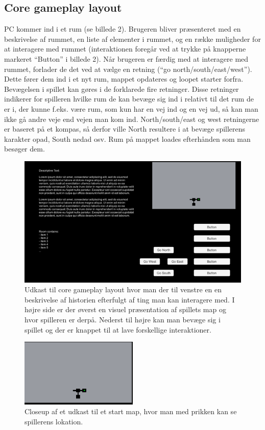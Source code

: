 \subsection{Core gameplay layout}
PC kommer ind i et rum (se billede 2).  Brugeren bliver præsenteret med en beskrivelse af rummet, en liste af elementer i rummet, og en række muligheder for at interagere med rummet (interaktionen foregår ved at trykke på knapperne markeret “Button” i billede 2). Når brugeren er færdig med at interagere med rummet, forlader de det ved at vælge en retning (“go north/south/east/west”). 
Dette fører dem ind i et nyt rum, mappet opdateres og loopet starter forfra.
Bevægelsen i spillet kan gøres i de forklarede fire retninger. Disse retninger indikerer for spilleren hvilke rum de kan bevæge sig ind i relativt til det rum de er i, der kunne f.eks. være rum, som kun har en vej ind og en vej ud, så kan man ikke gå andre veje end vejen man kom ind. North/south/east og west retningerne er baseret på et kompas, så derfor ville North resultere i at bevæge spillerens karakter opad, South nedad osv.
Rum på mappet loades efterhånden som man besøger dem.

\begin{figure}[H]
\centering
\includegraphics[width = \textwidth]{02-Body/Images/SpilLayout-udkast.png}
\caption{Udkast til core gameplay layout hvor man der til venstre en en beskrivelse af historien efterfulgt af ting man kan interagere med. I højre side er der øverst en visuel præsentation af spillets map og hvor spilleren er derpå. Nederst til højre kan man bevæge sig i spillet og der er knappet til at lave forskellige interaktioner.}
\label{fig:Core-Gameplay-Layout-udkast}
\end{figure}

\begin{figure}[H]
\centering
\includegraphics[width = 0.5\textwidth]{02-Body/Images/Map-closeup.png}
\caption{Closeup af et udkast til et start map, hvor man med prikken kan se spillerens lokation.}
\label{fig:Map-Layout-udkast}
\end{figure}

